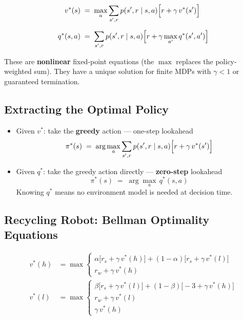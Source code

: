\documentclass[11pt,a4paper]{article}
\theoremstyle{definition}
\theoremstyle{plain}
\theoremstyle{remark}
\begin{document}
\begin{tcolorbox}[colback=green!5!white, colframe=green!60!black, title={Bellman Optimality Equations}]
\begin{align*}
    v^*(s) &\;=\; \max_a \sum_{s', r} p(s', r \mid s, a)\Bigl[r + \gamma\, v^*(s')\Bigr] \\[6pt]
    q^*(s, a) &\;=\; \sum_{s', r} p(s', r \mid s, a)\Bigl[r + \gamma \max_{a'} q^*(s', a')\Bigr]
\end{align*}
\end{tcolorbox}

These are \textbf{nonlinear} fixed-point equations (the $\max$ replaces the policy-weighted sum). They have a unique solution for finite MDPs with $\gamma < 1$ or guaranteed termination.

\subsection{Extracting the Optimal Policy}

\begin{itemize}
    \item Given $v^*$: take the \textbf{greedy} action — one-step lookahead
    \[
        \pi^*(s) \;=\; \arg\max_a \sum_{s', r} p(s', r \mid s, a)\Bigl[r + \gamma\, v^*(s')\Bigr]
    \]
    \item Given $q^*$: take the greedy action directly — \textbf{zero-step} lookahead
    \[
        \pi^*(s) \;=\; \arg\max_a\, q^*(s, a)
    \]
    Knowing $q^*$ means no environment model is needed at decision time.
\end{itemize}

\subsection{Recycling Robot: Bellman Optimality Equations}

\begin{align*}
    v^*(h) &= \max\!\begin{cases}
        \alpha\bigl[r_s + \gamma\, v^*(h)\bigr] + (1-\alpha)\bigl[r_s + \gamma\, v^*(l)\bigr] \\
        r_w + \gamma\, v^*(h)
    \end{cases} \\[6pt]
    v^*(l) &= \max\!\begin{cases}
        \beta\bigl[r_s + \gamma\, v^*(l)\bigr] + (1-\beta)\bigl[-3 + \gamma\, v^*(h)\bigr] \\
        r_w + \gamma\, v^*(l) \\
        \gamma\, v^*(h)
    \end{cases}
\end{align*}
\end{document}
